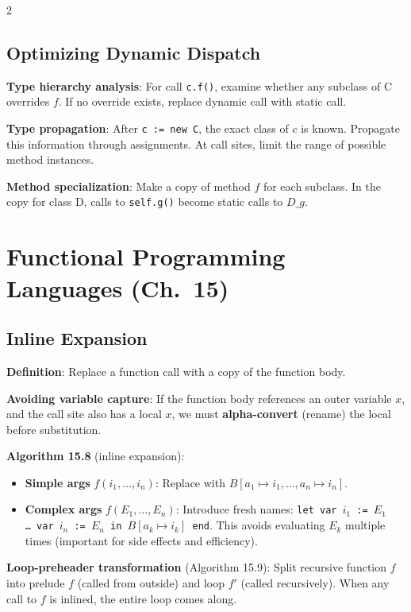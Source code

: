 \documentclass[9pt,landscape]{extarticle}
\begin{document}
\begin{multicols}{2}
\subsection{Optimizing Dynamic Dispatch}

\textbf{Type hierarchy analysis}: For call \texttt{c.f()}, examine whether any subclass of C overrides $f$. If no override exists, replace dynamic call with static call.

\textbf{Type propagation}: After \texttt{c := new C}, the exact class of $c$ is known. Propagate this information through assignments. At call sites, limit the range of possible method instances.

\textbf{Method specialization}: Make a copy of method $f$ for each subclass. In the copy for class D, calls to \texttt{self.g()} become static calls to $D\_g$.

\section{Functional Programming Languages (Ch.~15)}

\subsection{Inline Expansion}

\textbf{Definition}: Replace a function call with a copy of the function body.

\textbf{Avoiding variable capture}: If the function body references an outer variable $x$, and the call site also has a local $x$, we must \textbf{alpha-convert} (rename) the local before substitution.

\textbf{Algorithm 15.8} (inline expansion):
\begin{itemize}
  \item \textbf{Simple args} $f(i_1, \ldots, i_n)$: Replace with $B[a_1 \mapsto i_1, \ldots, a_n \mapsto i_n]$.
  \item \textbf{Complex args} $f(E_1, \ldots, E_n)$: Introduce fresh names: \texttt{let var $i_1$ := $E_1$ \ldots\ var $i_n$ := $E_n$ in $B[a_k \mapsto i_k]$ end}. This avoids evaluating $E_k$ multiple times (important for side effects and efficiency).
\end{itemize}

\textbf{Loop-preheader transformation} (Algorithm 15.9): Split recursive function $f$ into prelude $f$ (called from outside) and loop $f'$ (called recursively). When any call to $f$ is inlined, the entire loop comes along.


\end{multicols}
\end{document}
